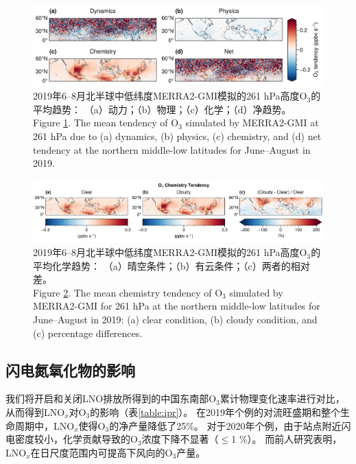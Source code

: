 \begin{figure}[!htbp]
    \centering
    \includegraphics[width=15cm]{./figures/uto3_tendency.png}
    \caption{
    2019年6--8月北半球中低纬度MERRA2-GMI模拟的261 hPa高度O$_3$的平均趋势：
    （a）动力；（b）物理；（c）化学；（d）净趋势。\\
    Figure \ref{fig:uto3_tendency}. The mean tendency of O$_3$ simulated by MERRA2-GMI at 261 hPa due to (a) dynamics, (b) physics, (c) chemistry, and (d) net tendency at the northern middle-low latitudes for June--August in 2019.
    }
    \label{fig:uto3_tendency}
\end{figure}


\begin{figure}[!htbp]
    \centering
    \includegraphics[width=15cm]{./figures/uto3_chem_tendency.png}
    \caption{
    2019年6--8月北半球中低纬度MERRA2-GMI模拟的261 hPa高度O$_3$的平均化学趋势：
    （a）晴空条件；（b）有云条件；（c）两者的相对差。\\
    Figure \ref{fig:uto3_chem_tendency}. The mean chemistry tendency of O$_3$ simulated by MERRA2-GMI for 261 hPa at the northern middle-low latitudes for June--August in 2019:
    (a) clear condition, (b) cloudy condition, and (c) percentage differences.
    }
    \label{fig:uto3_chem_tendency}
\end{figure}
\FloatBarrier


\subsection{闪电氮氧化物的影响} \label{sec:lnox_effects}

我们将开启和关闭LNO排放所得到的中国东南部O$_3$累计物理变化速率进行对比，从而得到LNO$_x$对O$_3$的影响（表\ref{table:ipr}）。
在2019年个例的对流旺盛期和整个生命周期中，LNO$_x$使得O$_3$的净产量降低了25\%。
对于2020年个例，由于站点附近闪电密度较小，化学贡献导致的O$_3$浓度下降不显著（$\leq$1 \%）。
而前人研究表明，LNO$_x$在日尺度范围内可提高下风向的O$_3$产量\citep{Pickering.1996,DeCaria.2005}。

